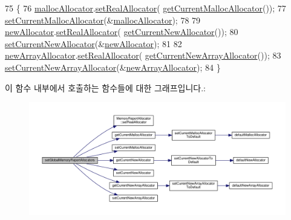 \begin{DoxyCode}
75 \{
76     \hyperlink{class_memory_reporter_plugin_aa49eebf4ef7d746fe9b0bd9d4f531a26}{mallocAllocator}.\hyperlink{class_memory_report_allocator_a737067a84ae7d257b322e2623c977367}{setRealAllocator}(
      \hyperlink{_test_memory_allocator_8h_a4d68edc44457e05a19847bd16c1b429c}{getCurrentMallocAllocator}());
77     \hyperlink{_test_memory_allocator_8h_ac06ad435c63d58e1bfdfdb9f64f2153a}{setCurrentMallocAllocator}(&\hyperlink{class_memory_reporter_plugin_aa49eebf4ef7d746fe9b0bd9d4f531a26}{mallocAllocator});
78 
79     \hyperlink{class_memory_reporter_plugin_a16c3ef79a69a69085afcf09a45204886}{newAllocator}.\hyperlink{class_memory_report_allocator_a737067a84ae7d257b322e2623c977367}{setRealAllocator}(
      \hyperlink{_test_memory_allocator_8h_a5e826253e0f3f50eb1f436318ba9d08c}{getCurrentNewAllocator}());
80     \hyperlink{_test_memory_allocator_8h_ab43dd49b1676f9c2e3e9cf1e17b38eff}{setCurrentNewAllocator}(&\hyperlink{class_memory_reporter_plugin_a16c3ef79a69a69085afcf09a45204886}{newAllocator});
81 
82     \hyperlink{class_memory_reporter_plugin_a3d542a63f3f729d8721651311e8a7eae}{newArrayAllocator}.\hyperlink{class_memory_report_allocator_a737067a84ae7d257b322e2623c977367}{setRealAllocator}(
      \hyperlink{_test_memory_allocator_8h_ade70dccc76a7f44a277c4204a96cb27e}{getCurrentNewArrayAllocator}());
83     \hyperlink{_test_memory_allocator_8h_a72424b9f39847a16faf8552bab210c97}{setCurrentNewArrayAllocator}(&\hyperlink{class_memory_reporter_plugin_a3d542a63f3f729d8721651311e8a7eae}{newArrayAllocator});
84 \}
\end{DoxyCode}


이 함수 내부에서 호출하는 함수들에 대한 그래프입니다.\+:
\nopagebreak
\begin{figure}[H]
\begin{center}
\leavevmode
\includegraphics[width=350pt]{class_memory_reporter_plugin_ad370cc906e33aa1c0d154a801821f0e3_cgraph}
\end{center}
\end{figure}




